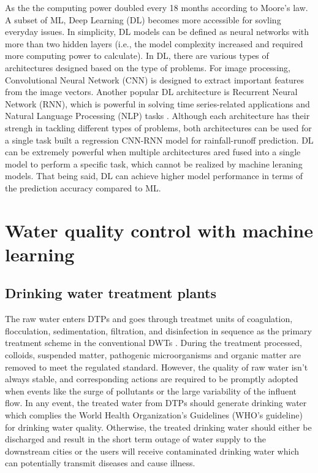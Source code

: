 As the the computing power doubled every 18 months according to Moore's law. A subset of ML, Deep Learning (DL) becomes more accessible for sovling everyday issues. In simplicity, DL models can be defined as neural networks with more than two hidden layers (i.e., the model complexity increased and required more computing power to calculate). In DL, there are various types of architectures designed based on the type of problems. For image processing, Convolutional Neural Network (CNN) is designed to extract important features from the image vectors. Another popular DL architecture is Recurrent Neural Network (RNN), which is powerful in solving time series-related applications and Natural Language Processing (NLP) tasks \citep{liERNNDesignOptimization2018}. Although each architecture has their strengh in tackling different types of problems, both architectures can be used for a single task \citet{liPredictionFlowBased2022} built a regression CNN-RNN model for rainfall-runoff prediction. DL can be extremely powerful when multiple architectures ared fused into a single model to perform a specific task, which cannot be realized by machine leraning models. That being said, DL can achieve higher model performance in terms of the prediction accuracy compared to ML. 

\section{Water quality control with machine learning}
\subsection{Drinking water treatment plants}
The raw water enters DTPs and goes through treatmet units of coagulation, flocculation, sedimentation, filtration, and disinfection in sequence as the primary treatment scheme in the conventional DWTs \citep{liRecentAdvancesArtificial2021}. During the treatment processed, colloids, suspended matter, pathogenic microorganisms and organic matter are removed to meet the regulated standard. However, the quality of raw water isn't always stable, and corresponding actions are required to be promptly adopted when events like the surge of pollutants or the large variability of the influent flow. In any event, the treated water from DTPs should generate drinking water which complies the World Health Organization's Guidelines (WHO's guideline) for drinking water quality. Otherwise, the treated drinking water should either be discharged and result in the short term outage of water supply to the downstream cities or the users will receive contaminated drinking water which can potentially transmit diseases and cause illness.

